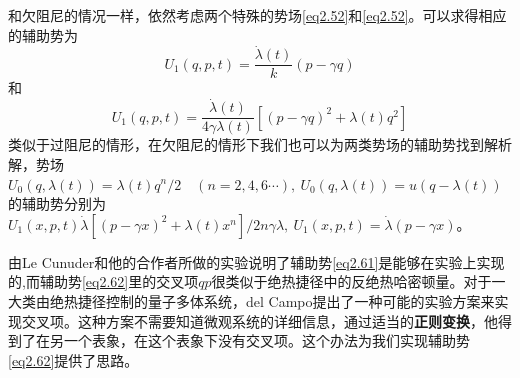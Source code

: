 和欠阻尼的情况一样，依然考虑两个特殊的势场\eqref{eq2.52}和\eqref{eq2.52}。可以求得相应的辅助势为
\begin{equation}
    U_{1}(q, p, t)=\frac{\dot{\lambda}(t)}{k}(p-\gamma q)
    \label{eq2.61}
\end{equation}
和
\begin{equation}
    U_{1}(q, p, t)=\frac{\dot{\lambda}(t)}{4 \gamma \lambda(t)}\left[(p-\gamma q)^{2}+\lambda(t) q^{2}\right]
    \label{eq2.62}
\end{equation}
类似于过阻尼的情形，在欠阻尼的情形下我们也可以为两类势场的辅助势找到解析解\cite{Li2016}，势场$U_0 (q, \lambda(t))= \lambda(t) q^{n} / 2 \quad (n=2,4,6\cdots) ,\ U_{0}(q, \lambda(t))=u(q-\lambda(t))$的辅助势分别为$U_{1}(x, p, t)\dot{\lambda}\left[(p-\gamma x)^{2}+\lambda(t) x^{n}\right] / 2 n \gamma \lambda ,\ U_{1}(x, p, t)=\dot{\lambda}(p-\gamma x)$。

由Le Cunuder和他的合作者\cite{LeCunuder2016}所做的实验说明了辅助势\eqref{eq2.61}是能够在实验上实现的,而辅助势\eqref{eq2.62}里的交叉项$qp$很类似于绝热捷径中的反绝热哈密顿量\cite{Jarzynski2013,Deffner2014,DelCampo2013}。对于一大类由绝热捷径控制的量子多体系统，del Campo提出了一种可能的实验方案来实现交叉项\cite{DelCampo2013}。这种方案不需要知道微观系统的详细信息，通过适当的\textbf{正则变换}，他得到了在另一个表象，在这个表象下没有交叉项。这个办法为我们实现辅助势\eqref{eq2.62}提供了思路。











